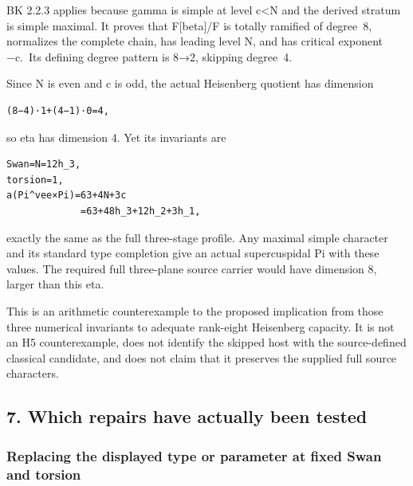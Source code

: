 BK 2.2.3 applies because gamma is simple at level c\textless N and the
derived stratum is simple maximal. It proves that F{[}beta{]}/F is
totally ramified of degree~8, normalizes the complete chain, has leading
level N, and has critical exponent −c.~Its defining degree pattern is
8→2, skipping degree~4.

Since N is even and c is odd, the actual Heisenberg quotient has
dimension

\begin{Verbatim}[fontsize=\small,breaklines=true,breakanywhere=true]
(8−4)·1+(4−1)·0=4,
\end{Verbatim}

so eta has dimension 4. Yet its invariants are

\begin{Verbatim}[fontsize=\small,breaklines=true,breakanywhere=true]
Swan=N=12h_3,
torsion=1,
a(Pi^vee×Pi)=63+4N+3c
             =63+48h_3+12h_2+3h_1,
\end{Verbatim}

exactly the same as the full three-stage profile. Any maximal simple
character and its standard type completion give an actual supercuspidal
Pi with these values. The required full three-plane source carrier would
have dimension 8, larger than this eta.

This is an arithmetic counterexample to the proposed implication from
those three numerical invariants to adequate rank-eight Heisenberg
capacity. It is not an H5 counterexample, does not identify the skipped
host with the source-defined classical candidate, and does not claim
that it preserves the supplied full source characters.

\hypertarget{dyadic_capacity-which-repairs-have-actually-been-tested}{%
\subsection{7. Which repairs have actually been
tested}\label{dyadic_capacity-which-repairs-have-actually-been-tested}}

\hypertarget{dyadic_capacity-replacing-the-displayed-type-or-parameter-at-fixed-swan-and-torsion}{%
\subsubsection{Replacing the displayed type or parameter at fixed Swan
and
torsion}\label{dyadic_capacity-replacing-the-displayed-type-or-parameter-at-fixed-swan-and-torsion}}

